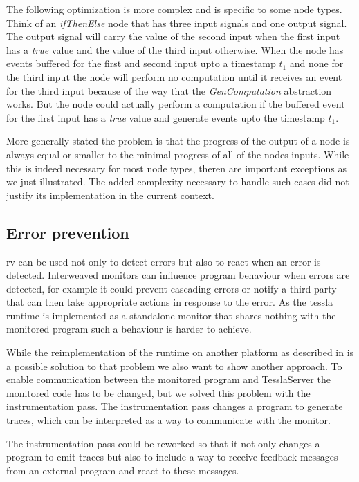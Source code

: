 The following optimization is more complex and is specific to some node types.
Think of an \emph{ifThenElse} node that has three input signals and one output signal.
The output signal will carry the value of the second input when the first input has a \emph{true} value and the value of the third input otherwise.
When the node has events buffered for the first and second input upto a timestamp \(t_1\) and none for the third input the node will perform no computation until it receives an event for the third input because of the way that the \emph{GenComputation} abstraction works.
But the node could actually perform a computation if the buffered event for the first input has a \emph{true} value and generate events upto the timestamp \(t_1\).

More generally stated the problem is that the progress of the output of a node is always equal or smaller to the minimal progress of all of the nodes inputs.
While this is indeed necessary for most node types, theren are important exceptions as we just illustrated.
The added complexity necessary to handle such cases did not justify its implementation in the current context.

\subsection{Error prevention}
\label{sec:conclusion:further_work:error_prevention}

\Gls{rv} can be used not only to detect errors but also to react when an error is detected.
Interweaved monitors can influence program behaviour when errors are detected, for example it could prevent cascading errors or notify a third party that can then take appropriate actions in response to the error.
As the \gls{tessla} runtime is implemented as a standalone monitor that shares nothing with the monitored program such a behaviour is harder to achieve.

While the reimplementation of the runtime on another platform as described in  is a possible solution to that problem we also want to show another approach.
To enable communication between the monitored program and TesslaServer the monitored code has to be changed, but we solved this problem with the instrumentation pass.
The instrumentation pass changes a program to generate traces, which can be interpreted as a way to communicate with the monitor.

The instrumentation pass could be reworked so that it not only changes a program to emit traces but also to include a way to receive feedback messages from an external program and react to these messages.
